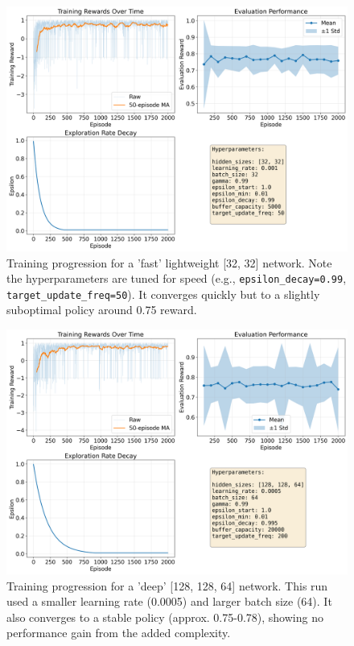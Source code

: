 \documentclass[conference]{IEEEtran}
\begin{document}
\begin{figure}[htbp]
\centerline{\includegraphics[width=\columnwidth]{images/gridworld_dqn_results_fast.png}}
\caption{Training progression for a 'fast' lightweight [32, 32] network. Note the hyperparameters are tuned for speed (e.g., \texttt{epsilon\_decay=0.99}, \texttt{target\_update\_freq=50}). It converges quickly but to a slightly suboptimal policy around 0.75 reward.}
\label{fig:fast_arch}
\end{figure}

\begin{figure}[htbp]
\centerline{\includegraphics[width=\columnwidth]{images/gridworld_dqn_results_deep.png}}
\caption{Training progression for a 'deep' [128, 128, 64] network. This run used a smaller learning rate (0.0005) and larger batch size (64). It also converges to a stable policy (approx. 0.75-0.78), showing no performance gain from the added complexity.}
\label{fig:deep_arch}
\end{figure}
\end{document}
